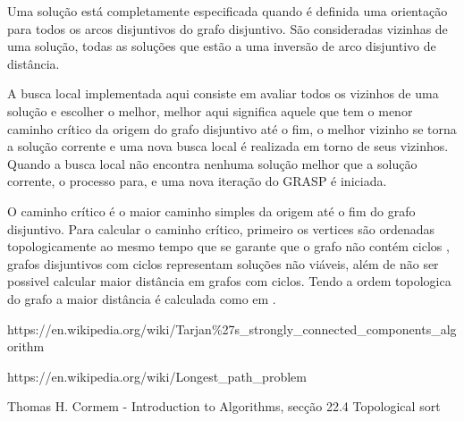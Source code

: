 \documentclass{article}
\begin{document}
Uma solução está completamente especificada quando é definida uma orientação
para todos os arcos disjuntivos do grafo disjuntivo. São consideradas
vizinhas de uma solução, todas as soluções que estão a uma inversão de
arco disjuntivo de distância.  

A busca local implementada aqui consiste em avaliar todos os vizinhos de uma 
solução e escolher o melhor, melhor aqui significa aquele que tem o menor 
caminho crítico da origem do grafo disjuntivo até o fim, o melhor vizinho 
se torna a solução corrente e uma nova busca local é realizada em torno de
seus vizinhos. Quando a busca local não encontra nenhuma solução melhor que 
a solução corrente, o processo para, e uma nova iteração do GRASP é iniciada.

O caminho crítico é o maior caminho simples da origem até o fim do grafo 
disjuntivo. Para calcular o caminho crítico, primeiro os vertices são ordenadas
topologicamente \cite{Cormem} ao mesmo tempo que se garante que o grafo não
contém ciclos \cite{tarjan}, grafos disjuntivos com ciclos representam soluções não viáveis,
além de não ser possivel calcular maior distância em grafos com ciclos. Tendo a
ordem topologica do grafo a maior distância é calculada como em \cite{longestPath}.




\begin{thebibliography}{9}
    https://en.wikipedia.org/wiki/Tarjan\%27s\_strongly\_connected\_components\_algorithm
    
    https://en.wikipedia.org/wiki/Longest\_path\_problem
    
    Thomas  H. Cormem - Introduction to Algorithms, secção 22.4 Topological sort

\end{thebibliography}
\end{document}
